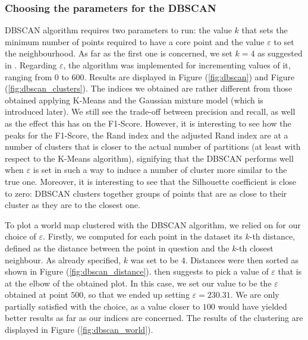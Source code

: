 \documentclass[a4paper]{article}
\begin{document}
	\subsubsection{Choosing the parameters for the DBSCAN}
	DBSCAN algorithm requires two parameters to run: the value $k$ that sets the minimum number of points required to have a core point and the value $\varepsilon$ to set the neighbourhood. As far as the first one is concerned, we set $k=4$ as suggested in \cite{Ester96adensity-based}.
	Regarding $\varepsilon$, the algorithm was implemented for incrementing values of it, ranging from $0$ to $600$. Results are displayed in Figure (\ref{fig:dbscan}) and Figure (\ref{fig:dbscan_clusters}).
	The indices we obtained are rather different from those obtained applying K-Means and the Gaussian mixture model (which is introduced later). We still see the trade-off between precision and recall, as well as the effect this has on the F1-Score. However, it is interesting to see how the peaks for the F1-Score, the Rand index and the adjusted Rand index are at a number of clusters that is closer to the actual number of partitions (at least with respect to the K-Means algorithm), signifying that the DBSCAN performs well when $\varepsilon$ is set in such a way to induce a number of cluster more similar to the true one. Moreover, it is interesting to see that the Silhouette coefficient is close to zero: DBSCAN clusters together groups of points that are as close to their cluster as they are to the closest one.
	
	To plot a world map clustered with the DBSCAN algorithm, we relied on \cite{Ester96adensity-based} for our choice of $\varepsilon$.
	Firstly, we computed for each point in the dataset its $k$-th distance, defined as the distance between the point in question and the $k$-th closest neighbour. As already specified, $k$ was set to be $4$. Distances were then sorted as shown in Figure (\ref{fig:dbscan_distance}).
	\cite{Ester96adensity-based} then suggests to pick a value of $\varepsilon$ that is at the elbow of the obtained plot. In this case, we set our value to be the $\varepsilon$ obtained at point $500$, so that we ended up setting $\varepsilon= 230.31$. We are only partially satisfied with the choice, as a value closer to $100$ would have yielded better results as far as our indices are concerned. The results of the clustering are displayed in Figure (\ref{fig:dbscan_world}).\\
\end{document}

